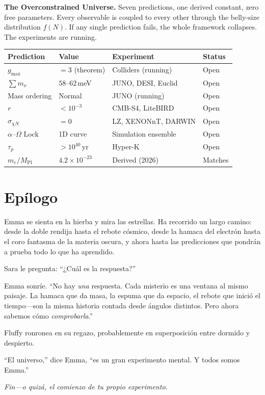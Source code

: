\documentclass[11pt, a4paper, openany]{book}
\begin{document}
\bigskip
\begin{center}
\begin{tcolorbox}[colback=structure!5,colframe=structure,width=0.85\textwidth,arc=2pt]
\textbf{The Overconstrained Universe.} Seven predictions, one derived constant, zero free parameters. Every observable is coupled to every other through the belly-size distribution $f(N)$. If any single prediction fails, the whole framework collapses. The experiments are running.

\medskip
\small
\begin{tabular}{@{}llll@{}}
\textbf{Prediction} & \textbf{Value} & \textbf{Experiment} & \textbf{Status} \\
\midrule
$g_{\max}$ & $= 3$ (theorem) & Colliders (running) & Open \\
$\sum m_\nu$ & $58$--$62$\,meV & JUNO, DESI, Euclid & Open \\
Mass ordering & Normal & JUNO (running) & Open \\
$r$ & $< 10^{-3}$ & CMB-S4, LiteBIRD & Open \\
$\sigma_{\chi N}$ & $= 0$ & LZ, XENONnT, DARWIN & Open \\
$\alpha$--$\Omega$ Lock & 1D curve & Simulation ensemble & Open \\
$\tau_p$ & $> 10^{40}$\,yr & Hyper-K & Open \\
\midrule
$m_e/M_{\mathrm{Pl}}$ & $4.2\times 10^{-23}$ & Derived (2026) & Matches \\
\end{tabular}
\end{tcolorbox}
\end{center}

\chapter*{Epílogo}

Emma se sienta en la hierba y mira las estrellas. Ha recorrido un largo camino: desde la doble rendija hasta el rebote cósmico, desde la hamaca del electrón hasta el coro fantasma de la materia oscura, y ahora hasta las predicciones que pondrán a prueba todo lo que ha aprendido.

Sara le pregunta: ``¿Cuál es la respuesta?''

Emma sonríe. ``No hay \emph{una} respuesta. Cada misterio es una ventana al mismo paisaje. La hamaca que da masa, la espuma que da espacio, el rebote que inició el tiempo---son la misma historia contada desde ángulos distintos. Pero ahora sabemos cómo \emph{comprobarla}.''

Fluffy ronronea en su regazo, probablemente en superposición entre dormido y despierto.

``El universo,'' dice Emma, ``es un gran experimento mental. Y todos somos Emma.''

\vspace{1em}
\begin{center}
\textit{Fin---o quizá, el comienzo de tu propio experimento.}
\end{center}
\end{document}
